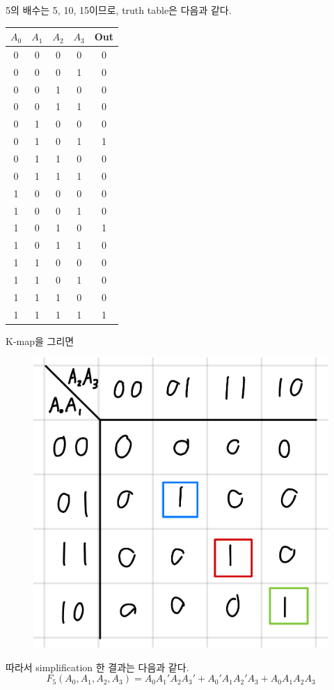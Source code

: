 \documentclass{scrartcl}
\begin{document}
5의 배수는 5, 10, 15이므로, truth table은 다음과 같다.
\begin{table}[H]
  \centering
  \begin{tabular}{|cccc|c|}
    \hline
    \(A_0\) & \(A_1\) & \(A_2\) & \(A_3\) & Out \\
    \hline
    0       & 0       & 0       & 0       & 0   \\
    0       & 0       & 0       & 1       & 0   \\
    0       & 0       & 1       & 0       & 0   \\
    0       & 0       & 1       & 1       & 0   \\
    0       & 1       & 0       & 0       & 0   \\
    0       & 1       & 0       & 1       & 1   \\
    0       & 1       & 1       & 0       & 0   \\
    0       & 1       & 1       & 1       & 0   \\
    1       & 0       & 0       & 0       & 0   \\
    1       & 0       & 0       & 1       & 0   \\
    1       & 0       & 1       & 0       & 1   \\
    1       & 0       & 1       & 1       & 0   \\
    1       & 1       & 0       & 0       & 0   \\
    1       & 1       & 0       & 1       & 0   \\
    1       & 1       & 1       & 0       & 0   \\
    1       & 1       & 1       & 1       & 1   \\
    \hline
  \end{tabular}
\end{table}
K-map을 그리면
\begin{figure}[H]
  \centering
  \includegraphics[width=0.3\linewidth]{lab3_2_5_km}
\end{figure}
따라서 simplification 한 결과는 다음과 같다.
\[
  F_5(A_0, A_1, A_2, A_3) = A_0 A_1' A_2 A_3' + A_0' A_1 A_2' A_3 + A_0 A_1 A_2 A_3
\]
\end{document}

